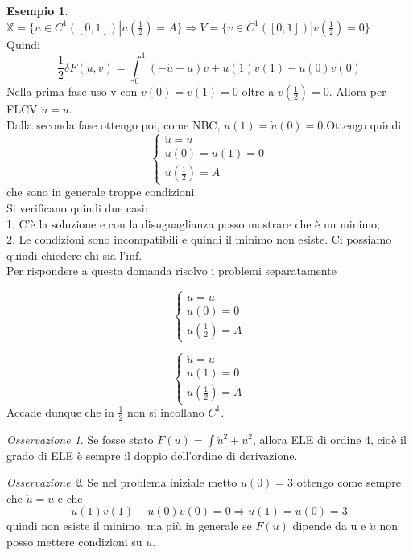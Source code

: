 \documentclass[a4paper]{book}
\theoremstyle{definition}
\newtheorem{ex}{Esempio}
\theoremstyle{remark}
\newtheorem{oss}{Osservazione}
\theoremstyle{definition}
\newcommand{\bbx}{\mathbb{X}}
\newcommand{\ra}{\Rightarrow}
\begin{document}
\begin{ex}
$\bbx =\{u \in C^1([0,1])| u(\frac12) = A\} \ra V =\{v \in C^1([0,1])| v(\frac12) = 0\} $\\
Quindi
\[
	\frac12 \delta F(u, v) = \int_{0}^{1}(-\ddot{u} + u)v + \dot{u}(1)v(1) - \dot{u}(0)v(0)
\]
Nella prima fase uso v con $v(0)=v(1)=0$ oltre a $v(\frac12)=0$. Allora per FLCV $\ddot{u} = u$.\\
Dalla seconda fase ottengo poi, come NBC, $\dot{u}(1)=\dot{u}(0)=0$.Ottengo quindi
\[
	\begin{cases}
	\ddot{u} = u\\
	\dot{u}(0) = \dot{u}(1) = 0\\
	u(\frac12) = A
	\end{cases}
\]
che sono in generale troppe condizioni.\\
Si verificano quindi due casi:\\
1. C'è la soluzione e con la disuguaglianza posso mostrare che è un minimo;\\
2. Le condizioni sono incompatibili e quindi il minimo non esiste. Ci possiamo quindi chiedere chi sia l'inf.\\
Per rispondere a questa domanda risolvo i problemi separatamente

\[
	\begin{cases}
	\ddot{u} = u\\
	\dot{u}(0) = 0\\
	u(\frac12) = A
	\end{cases}
\]

\[
	\begin{cases}
	\ddot{u} = u\\
	\dot{u}(1) = 0\\
	u(\frac12) = A
	\end{cases}
\]
Accade dunque che in $\frac12$ non si incollano $C^1$.
\end{ex}

\begin{oss}
Se fosse stato $F(u) = \int \ddot{u}^2+ u^2$, allora ELE di ordine 4, cioè il grado di ELE è sempre il doppio dell'ordine di derivazione.
\end{oss}

\begin{oss}
Se nel problema iniziale metto $\dot{u}(0) = 3$ ottengo come sempre che $\ddot{u} = u$ e che 
\[
	\dot{u}(1) v(1) - \dot{u}(0)v(0) = 0 \ra \dot{u}(1) = \dot{u}(0) = 3
\]
quindi non esiste il minimo, ma più in generale se $F(u)$ dipende da u e $\dot{u}$ non posso mettere condizioni su $\dot{u}$.
\end{oss}
\end{document}
